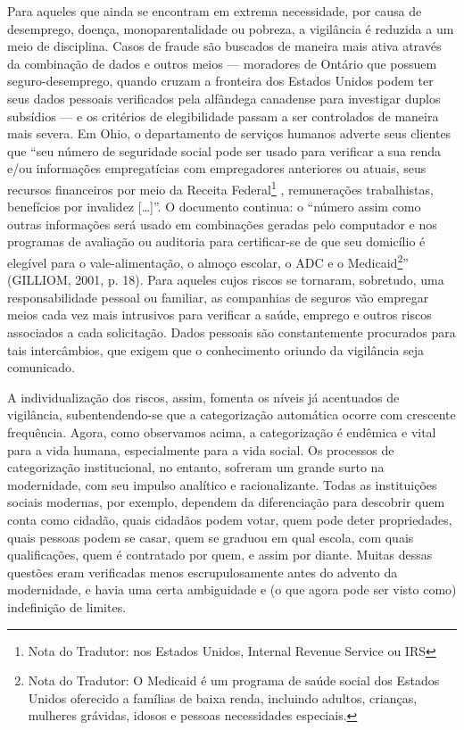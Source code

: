 Para aqueles que ainda se encontram em extrema necessidade, por causa de
desemprego, doença, monoparentalidade ou pobreza, a vigilância é
reduzida a um meio de disciplina. Casos de fraude são buscados de
maneira mais ativa através da combinação de dados e outros meios ---
moradores de Ontário que possuem seguro-desemprego, quando cruzam a
fronteira dos Estados Unidos podem ter seus dados pessoais verificados
pela alfândega canadense para investigar duplos subsídios --- e os
critérios de elegibilidade passam a ser controlados de maneira mais
severa. Em Ohio, o departamento de serviços humanos adverte seus
clientes que ``seu número de seguridade social pode ser usado para
verificar a sua renda e/ou informações empregatícias com empregadores
anteriores ou atuais, seus recursos financeiros por meio da Receita
Federal\footnote{Nota do Tradutor: nos Estados Unidos, Internal Revenue
  Service ou IRS} , remunerações trabalhistas, benefícios por invalidez
{[}\ldots{}{]}''. O documento continua: o ``número assim como outras
informações será usado em combinações geradas pelo computador e nos
programas de avaliação ou auditoria para certificar-se de que seu
domicílio é elegível para o vale-alimentação, o almoço escolar, o ADC e
o Medicaid\footnote{Nota do Tradutor: O Medicaid é um programa de saúde
  social dos Estados Unidos oferecido a famílias de baixa renda,
  incluindo adultos, crianças, mulheres grávidas, idosos e pessoas
  necessidades especiais.}'' (GILLIOM, 2001, p. 18). Para aqueles cujos
riscos se tornaram, sobretudo, uma responsabilidade pessoal ou familiar,
as companhias de seguros vão empregar meios cada vez mais intrusivos
para verificar a saúde, emprego e outros riscos associados a cada
solicitação. Dados pessoais são constantemente procurados para tais
intercâmbios, que exigem que o conhecimento oriundo da vigilância seja
comunicado.

A individualização dos riscos, assim, fomenta os níveis já acentuados de
vigilância, subentendendo-se que a categorização automática ocorre com
crescente frequência. Agora, como observamos acima, a categorização é
endêmica e vital para a vida humana, especialmente para a vida social.
Os processos de categorização institucional, no entanto, sofreram um
grande surto na modernidade, com seu impulso analítico e racionalizante.
Todas as instituições sociais modernas, por exemplo, dependem da
diferenciação para descobrir quem conta como cidadão, quais cidadãos
podem votar, quem pode deter propriedades, quais pessoas podem se casar,
quem se graduou em qual escola, com quais qualificações, quem é
contratado por quem, e assim por diante. Muitas dessas questões eram
verificadas menos escrupulosamente antes do advento da modernidade, e
havia uma certa ambiguidade e (o que agora pode ser visto como)
indefinição de limites.

